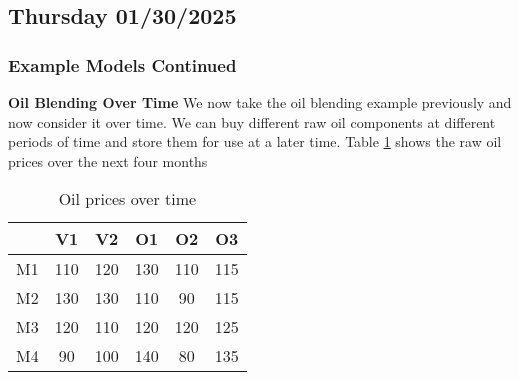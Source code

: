 \subsection{Thursday 01/30/2025}
\subsubsection{Example Models Continued}
\textbf{Oil Blending Over Time}
We now take the oil blending example previously and now consider it over time.
We can buy different raw oil components at different periods of time and store them for use at a later time.
Table \ref{tab:oil_prices} shows the raw oil prices over the next four months
\begin{table}[h!]
\centering
\begin{tabular}{|c|c|c|c|c|c|}
\hline
     & V1  & V2  & O1  & O2  & O3  \\ \hline
M1 & 110 & 120 & 130 & 110 & 115 \\ \hline
M2 & 130 & 130 & 110 & 90  & 115 \\ \hline
M3 & 120 & 110 & 120 & 120 & 125 \\ \hline
M4 & 90  & 100 & 140 & 80  & 135 \\ \hline
\end{tabular}
\caption{Oil prices over time}
\label{tab:oil_prices}
\end{table}

